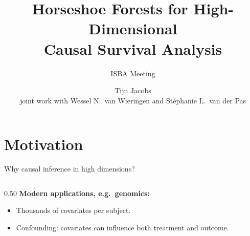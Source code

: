 \documentclass[10pt,aspectratio=169]{beamer}
\title{Horseshoe Forests for High-Dimensional\\ Causal Survival Analysis}
\subtitle{ISBA Meeting}
\date{}
\author{Tijn Jacobs \\
\small joint work with Wessel N.\ van Wieringen and St\'ephanie L.\ van der Pas}
\institute{Vrije Universiteit Amsterdam}
\begin{document}
\maketitle

\section{Motivation}

\begin{frame}{Why causal inference in high dimensions?}
\begin{columns}[T,onlytextwidth]
\begin{column}{0.50\textwidth}
\vspace{0.5cm}
\textbf{Modern applications, e.g.\ genomics:}
\begin{itemize}
  \item Thousands of covariates per subject.
  \item Confounding: covariates can influence both treatment and outcome.
\end{itemize}

\end{column}
\end{columns}
\end{frame}
\end{document}
